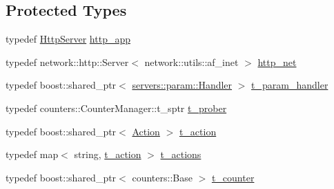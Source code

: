 \subsection*{Protected Types}
\begin{DoxyCompactItemize}
\item 
typedef \hyperlink{classxtd_1_1servers_1_1app_1_1HttpServer}{Http\+Server} \hyperlink{classxtd_1_1servers_1_1app_1_1HttpServer_ad879d72fb0151a3c383ccbe75bb642cc}{http\+\_\+app}
\item 
typedef network\+::http\+::\+Server$<$ network\+::utils\+::af\+\_\+inet $>$ \hyperlink{classxtd_1_1servers_1_1app_1_1HttpServer_ac5263de622bb17c3ec921a00266ea053}{http\+\_\+net}
\item 
typedef boost\+::shared\+\_\+ptr$<$ \hyperlink{classxtd_1_1servers_1_1param_1_1Handler}{servers\+::param\+::\+Handler} $>$ \hyperlink{classxtd_1_1servers_1_1app_1_1HttpServer_a9704ed4f011ec3a7424da2f2229477e1}{t\+\_\+param\+\_\+handler}
\item 
typedef counters\+::\+Counter\+Manager\+::t\+\_\+sptr \hyperlink{classxtd_1_1servers_1_1app_1_1HttpServer_ace89439f838ede46ec55a6ec7cc27888}{t\+\_\+prober}
\item 
typedef boost\+::shared\+\_\+ptr$<$ \hyperlink{classxtd_1_1servers_1_1app_1_1Action}{Action} $>$ \hyperlink{classxtd_1_1servers_1_1app_1_1HttpServer_a1353c6e9098dd5f8a74d978a7049ad27}{t\+\_\+action}
\item 
typedef map$<$ string, \hyperlink{classxtd_1_1servers_1_1app_1_1HttpServer_a1353c6e9098dd5f8a74d978a7049ad27}{t\+\_\+action} $>$ \hyperlink{classxtd_1_1servers_1_1app_1_1HttpServer_ac61c9a29bf64b94cb8ca4c766f8309c3}{t\+\_\+actions}
\item 
typedef boost\+::shared\+\_\+ptr$<$ counters\+::\+Base $>$ \hyperlink{classxtd_1_1servers_1_1app_1_1HttpServer_aaef467afe1f5191f38758088615c09c0}{t\+\_\+counter}
\end{DoxyCompactItemize}
